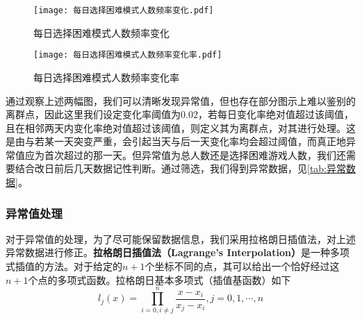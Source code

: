 \documentclass{MathModeling}
\begin{document}
	\begin{figure}[H]
		\centering
		\begin{minipage}{0.48\linewidth}
			\centering
			\texttt{[image: 每日选择困难模式人数频率变化.pdf]}
			\caption{每日选择困难模式人数频率变化}
			\label{fig:每日选择困难模式人数频率变化}
		\end{minipage}
		\begin{minipage}{0.48\linewidth}
			\centering
			\texttt{[image: 每日选择困难模式人数频率变化率.pdf]}
			\caption{每日选择困难模式人数频率变化率}
			\label{fig:每日选择困难模式人数频率变化率}
		\end{minipage}
	\end{figure}
	通过观察上述两幅图，我们可以清晰发现异常值，但也存在部分图示上难以鉴别的离群点，因此这里我们设定变化率阈值为$0.02$，若每日变化率绝对值超过该阈值，且在相邻两天内变化率绝对值超过该阈值，则定义其为离群点，对其进行处理。这是由与若某一天突变严重，会引起当天与后一天变化率均会超过阈值，而真正地异常值应为首次超过的那一天。但异常值为总人数还是选择困难游戏人数，我们还需要结合改日前后几天数据记性判断。通过筛选，我们得到异常数据，见\textcolor{blue}{\cref{tab:异常数据}}。
\begin{table}[H]
	\centering
	\caption{异常数据分析}
	\label{tab:异常数据}
\end{table}

	\subsubsection{异常值处理}
对于异常值的处理，为了尽可能保留数据信息，我们采用拉格朗日插值法，对上述异常数据进行修正。\textbf{拉格朗日插值法（Lagrange's Interpolation）}是一种多项式插值的方法。对于给定的$n+1$个坐标不同的点，其可以给出一个恰好经过这$n+1$个点的多项式函数。拉格朗日基本多项式（插值基函数）如下
\begin{equation}
	l_{j}\left(x\right)=\prod_{i=0,i\neq j}^{n}\frac{x-x_{i}}{x_{j}-x_{i}},j=0,1,\cdots,n
\end{equation}
\end{document}
